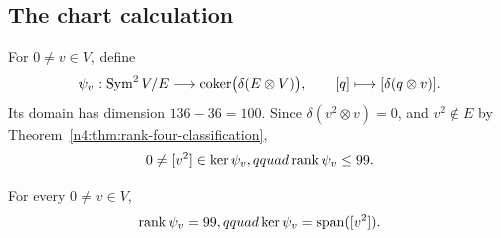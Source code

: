 \subsection{The chart calculation}\label{n4:sec:chart}

For \(0\neq v\in V\), define
\begin{equation}\label{n4:eq:psi}
  \psi_v:\operatorname{Sym}^2V/E\longrightarrow
  \operatorname{coker}\bigl(\delta(E\otimes V)\bigr),\qquad
  [q]\longmapsto[\delta(q\otimes v)].
\end{equation}
Its domain has dimension \(136-36=100\). Since
\(\delta(v^2\otimes v)=0\), and \(v^2\notin E\) by
Theorem~\ref{n4:thm:rank-four-classification},
\begin{equation}\label{n4:eq:obvious-kernel}
  0\neq[v^2]\in\ker\psi_v,qquad \operatorname{rank}\psi_v\leq99.
\end{equation}

\begin{proposition}\label{n4:prop:chart}
For every \(0\neq v\in V\),
\[
  \operatorname{rank}\psi_v=99,qquad \ker\psi_v=\operatorname{span}([v^2]).
\]
\end{proposition}

